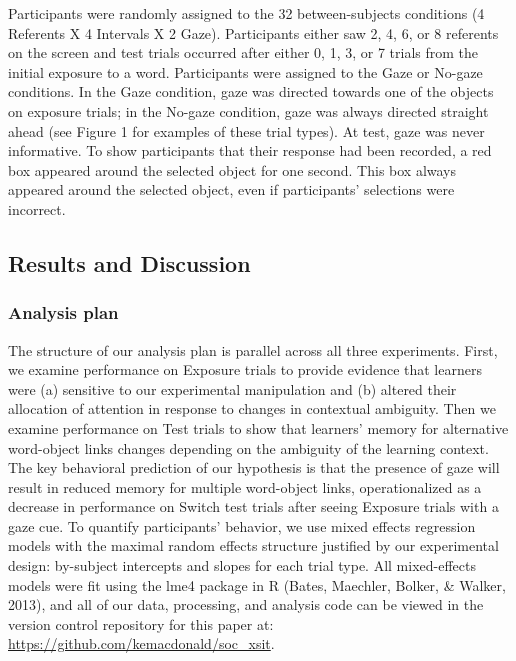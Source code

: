 \documentclass[authoryear, review]{elsarticle}
\begin{document}
Participants were randomly assigned to the 32 between-subjects
conditions (4 Referents X 4 Intervals X 2 Gaze). Participants either saw
2, 4, 6, or 8 referents on the screen and test trials occurred after
either 0, 1, 3, or 7 trials from the initial exposure to a word.
Participants were assigned to the Gaze or No-gaze conditions. In the
Gaze condition, gaze was directed towards one of the objects on exposure
trials; in the No-gaze condition, gaze was always directed straight
ahead (see Figure 1 for examples of these trial types). At test, gaze
was never informative. To show participants that their response had been
recorded, a red box appeared around the selected object for one second.
This box always appeared around the selected object, even if
participants' selections were incorrect.

\subsection{Results and Discussion}\label{results-and-discussion}

\subsubsection{Analysis plan}\label{analysis-plan}

The structure of our analysis plan is parallel across all three
experiments. First, we examine performance on Exposure trials to provide
evidence that learners were (a) sensitive to our experimental
manipulation and (b) altered their allocation of attention in response
to changes in contextual ambiguity. Then we examine performance on Test
trials to show that learners' memory for alternative word-object links
changes depending on the ambiguity of the learning context. The key
behavioral prediction of our hypothesis is that the presence of gaze
will result in reduced memory for multiple word-object links,
operationalized as a decrease in performance on Switch test trials after
seeing Exposure trials with a gaze cue. To quantify participants'
behavior, we use mixed effects regression models with the maximal random
effects structure justified by our experimental design: by-subject
intercepts and slopes for each trial type. All mixed-effects models were
fit using the lme4 package in R (Bates, Maechler, Bolker, \& Walker,
2013), and all of our data, processing, and analysis code can be viewed
in the version control repository for this paper at:
\url{https://github.com/kemacdonald/soc_xsit}.
\end{document}
